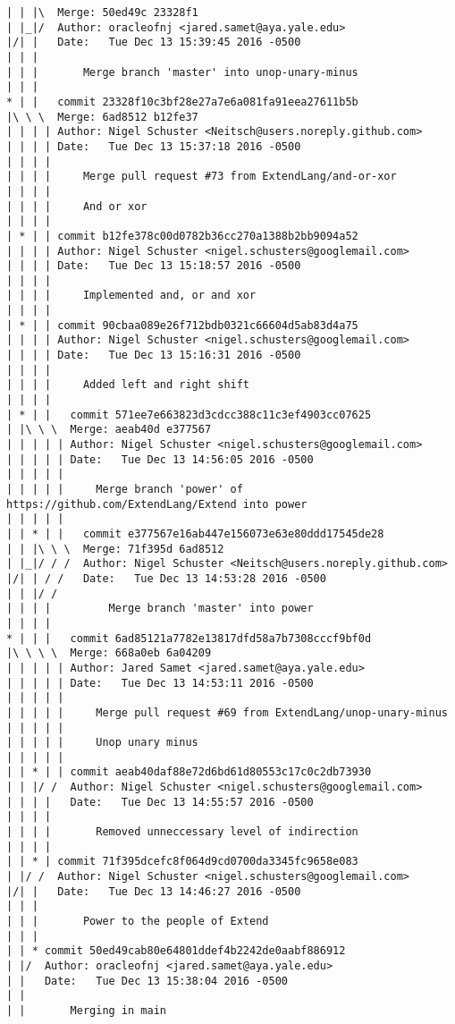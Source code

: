 \begin{lstlisting}
| | |\  Merge: 50ed49c 23328f1
| |_|/  Author: oracleofnj <jared.samet@aya.yale.edu>
|/| |   Date:   Tue Dec 13 15:39:45 2016 -0500
| | |   
| | |       Merge branch 'master' into unop-unary-minus
| | |      
* | |   commit 23328f10c3bf28e27a7e6a081fa91eea27611b5b
|\ \ \  Merge: 6ad8512 b12fe37
| | | | Author: Nigel Schuster <Neitsch@users.noreply.github.com>
| | | | Date:   Tue Dec 13 15:37:18 2016 -0500
| | | | 
| | | |     Merge pull request #73 from ExtendLang/and-or-xor
| | | |     
| | | |     And or xor
| | | |     
| * | | commit b12fe378c00d0782b36cc270a1388b2bb9094a52
| | | | Author: Nigel Schuster <nigel.schusters@googlemail.com>
| | | | Date:   Tue Dec 13 15:18:57 2016 -0500
| | | | 
| | | |     Implemented and, or and xor
| | | |     
| * | | commit 90cbaa089e26f712bdb0321c66604d5ab83d4a75
| | | | Author: Nigel Schuster <nigel.schusters@googlemail.com>
| | | | Date:   Tue Dec 13 15:16:31 2016 -0500
| | | | 
| | | |     Added left and right shift
| | | |       
| * | |   commit 571ee7e663823d3cdcc388c11c3ef4903cc07625
| |\ \ \  Merge: aeab40d e377567
| | | | | Author: Nigel Schuster <nigel.schusters@googlemail.com>
| | | | | Date:   Tue Dec 13 14:56:05 2016 -0500
| | | | | 
| | | | |     Merge branch 'power' of https://github.com/ExtendLang/Extend into power
| | | | |        
| | * | |   commit e377567e16ab447e156073e63e80ddd17545de28
| | |\ \ \  Merge: 71f395d 6ad8512
| |_|/ / /  Author: Nigel Schuster <Neitsch@users.noreply.github.com>
|/| | / /   Date:   Tue Dec 13 14:53:28 2016 -0500
| | |/ /    
| | | |         Merge branch 'master' into power
| | | |       
* | | |   commit 6ad85121a7782e13817dfd58a7b7308cccf9bf0d
|\ \ \ \  Merge: 668a0eb 6a04209
| | | | | Author: Jared Samet <jared.samet@aya.yale.edu>
| | | | | Date:   Tue Dec 13 14:53:11 2016 -0500
| | | | | 
| | | | |     Merge pull request #69 from ExtendLang/unop-unary-minus
| | | | |     
| | | | |     Unop unary minus
| | | | |      
| | * | | commit aeab40daf88e72d6bd61d80553c17c0c2db73930
| | |/ /  Author: Nigel Schuster <nigel.schusters@googlemail.com>
| | | |   Date:   Tue Dec 13 14:55:57 2016 -0500
| | | |   
| | | |       Removed unneccessary level of indirection
| | | |     
| | * | commit 71f395dcefc8f064d9cd0700da3345fc9658e083
| |/ /  Author: Nigel Schuster <nigel.schusters@googlemail.com>
|/| |   Date:   Tue Dec 13 14:46:27 2016 -0500
| | |   
| | |       Power to the people of Extend
| | |    
| | * commit 50ed49cab80e64801ddef4b2242de0aabf886912
| |/  Author: oracleofnj <jared.samet@aya.yale.edu>
| |   Date:   Tue Dec 13 15:38:04 2016 -0500
| |   
| |       Merging in main

\end{lstlisting}
